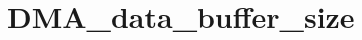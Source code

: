 \hypertarget{group___d_m_a__data__buffer__size}{\section{D\-M\-A\-\_\-data\-\_\-buffer\-\_\-size}
\label{group___d_m_a__data__buffer__size}
}
